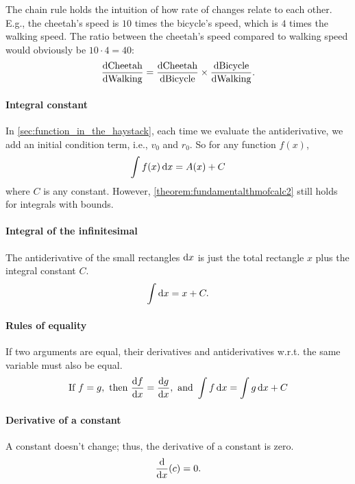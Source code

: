 The chain rule holds the intuition of how rate of changes relate to each other. E.g., the cheetah's speed is $10$ times the bicycle's speed, which is $4$ times the walking speed. The ratio between the cheetah's speed compared to walking speed would obviously be $10\cdot 4 = 40$:
\begin{equation}
    \odv{\textrm{Cheetah}}{\textrm{Walking}} = \odv{\textrm{Cheetah}}{\textrm{Bicycle}} \times \odv{\textrm{Bicycle}}{\textrm{Walking}}.
\end{equation}

\paragraph{Integral constant} In \cref{sec:function_in_the_haystack}, each time we evaluate the antiderivative, we add an initial condition term, i.e., $v_0$ and $r_0$. So for any function $f(x)$,
\begin{equation}
    \int f(x)\odif{x} = A(x) + C
\end{equation}
where $C$ is any constant. However, \cref{theorem:fundamentalthmofcalc2} still holds for integrals with bounds.

\paragraph{Integral of the infinitesimal} The antiderivative of the small rectangles $\odif{x}$ is just the total rectangle $x$ plus the integral constant $C$. 
\begin{equation}
    \int \odif{x} = x + C.
\end{equation}

\paragraph{Rules of equality} If two arguments are equal, their derivatives and antiderivatives w.r.t. the same variable must also be equal.
\begin{equation*}
    \textrm{If}~f = g,\textrm{ then }\odv{f}{x} = \odv{g}{x},\textrm{ and }\int f\odif{x} = \int g\odif{x} + C
\end{equation*}

\paragraph{Derivative of a constant} A constant doesn't change; thus, the derivative of a constant is zero. 
\begin{equation}
    \odv*{(c)}{x} = 0.
\end{equation}

